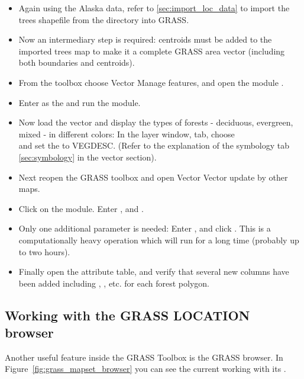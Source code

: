 \begin{itemize}[label=--]
\item Again using the Alaska data, refer to \ref{sec:import_loc_data} to
import the trees shapefile from the  directory
into GRASS.
\item Now an intermediary step is required: centroids must be added to the
imported trees map to make it a complete GRASS area vector (including both
boundaries and centroids).
\item From the toolbox choose Vector \arrow Manage features, and open the
module .
\item Enter as the 
and run the module.
\item Now load the  vector and display the types of
forests - deciduous, evergreen, mixed - in different colors: In the layer
 window,  tab, choose \\
 and set the
 to VEGDESC. (Refer to the
explanation of the symbology tab \ref{sec:symbology} in the vector section).
\item Next reopen the GRASS toolbox and open Vector \arrow Vector update by other
maps.
\item Click on the  module. Enter ,
and .
\item Only one additional parameter is needed: Enter , and click . This is a computationally
heavy operation which will run for a long time (probably up to two hours).
\item Finally open the  attribute table, and verify
that several new columns have been added including ,
,  etc. for each forest polygon.
\end{itemize}

\subsection{Working with the GRASS LOCATION browser} 

Another useful feature inside the GRASS Toolbox is the GRASS
 browser. In Figure~\ref{fig:grass_mapset_browser} you
can see the current working  with its .

